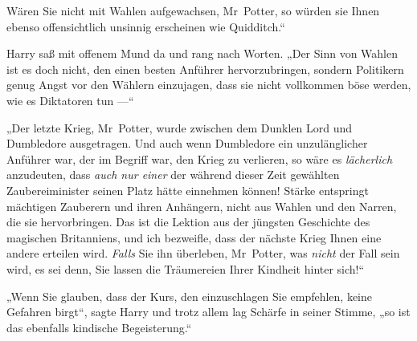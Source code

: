Wären Sie nicht mit Wahlen aufgewachsen, Mr~Potter, so würden sie Ihnen ebenso offensichtlich unsinnig erscheinen wie Quidditch.“

Harry saß mit offenem Mund da und rang nach Worten.
„Der Sinn von Wahlen ist es doch nicht, den einen besten Anführer hervorzubringen, sondern Politikern genug Angst vor den Wählern einzujagen, dass sie nicht vollkommen böse werden, wie es Diktatoren tun —“

„Der letzte Krieg, Mr~Potter, wurde zwischen dem Dunklen Lord und Dumbledore ausgetragen. Und auch wenn Dumbledore ein unzulänglicher Anführer war, der im Begriff war, den Krieg zu verlieren, so wäre es \emph{lächerlich} anzudeuten, dass \emph{auch nur einer} der während dieser Zeit gewählten Zaubereiminister seinen Platz hätte einnehmen können! Stärke entspringt mächtigen Zauberern und ihren Anhängern, nicht aus Wahlen und den Narren, die sie hervorbringen. Das ist die Lektion aus der jüngsten Geschichte des magischen Britanniens, und ich bezweifle, dass der nächste Krieg Ihnen eine andere erteilen wird. \emph{Falls} Sie ihn überleben, Mr~Potter, was \emph{nicht} der Fall sein wird, es sei denn, Sie lassen die Träumereien Ihrer Kindheit hinter sich!“

„Wenn Sie glauben, dass der Kurs, den einzuschlagen Sie empfehlen, keine Gefahren birgt“, sagte Harry und trotz allem lag Schärfe in seiner Stimme, „so ist das ebenfalls kindische Begeisterung.“

